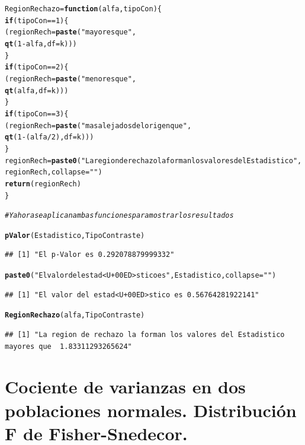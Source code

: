 \documentclass[10pt,a4paper]{article}\usepackage[]{graphicx}\usepackage[]{color}
\makeatletter
\newcommand{\hlnum}[1]{\textcolor[rgb]{0.686,0.059,0.569}{#1}}%
\newcommand{\hlstr}[1]{\textcolor[rgb]{0.192,0.494,0.8}{#1}}%
\newcommand{\hlcom}[1]{\textcolor[rgb]{0.678,0.584,0.686}{\textit{#1}}}%
\newcommand{\hlopt}[1]{\textcolor[rgb]{0,0,0}{#1}}%
\newcommand{\hlstd}[1]{\textcolor[rgb]{0.345,0.345,0.345}{#1}}%
\newcommand{\hlkwa}[1]{\textcolor[rgb]{0.161,0.373,0.58}{\textbf{#1}}}%
\newcommand{\hlkwb}[1]{\textcolor[rgb]{0.69,0.353,0.396}{#1}}%
\newcommand{\hlkwc}[1]{\textcolor[rgb]{0.333,0.667,0.333}{#1}}%
\newcommand{\hlkwd}[1]{\textcolor[rgb]{0.737,0.353,0.396}{\textbf{#1}}}%
\newenvironment{kframe}{%
 \def\at@end@of@kframe{}%
 \ifinner\ifhmode%
  \def\at@end@of@kframe{\end{minipage}}%
  \begin{minipage}{\columnwidth}%
 \fi\fi%
 \def\FrameCommand##1{\hskip\@totalleftmargin \hskip-\fboxsep
 \colorbox{shadecolor}{##1}\hskip-\fboxsep
     \hskip-\linewidth \hskip-\@totalleftmargin \hskip\columnwidth}%
 \MakeFramed {\advance\hsize-\width
   \@totalleftmargin\z@ \linewidth\hsize
   \@setminipage}}%
 {\par\unskip\endMakeFramed%
 \at@end@of@kframe}
\newenvironment{knitrout}{}{} %
\makeatother
\begin{document}
\begin{knitrout}
\begin{kframe}
\begin{alltt}
    \hlstd{RegionRechazo} \hlkwb{=} \hlkwa{function}\hlstd{(}\hlkwc{alfa}\hlstd{,} \hlkwc{tipoCon}\hlstd{)\{}
      \hlkwa{if}\hlstd{(tipoCon} \hlopt{==} \hlnum{1}\hlstd{)\{}
        \hlstd{(regionRech} \hlkwb{=} \hlkwd{paste}\hlstd{(}\hlstr{"mayores que "}\hlstd{,}
                            \hlkwd{qt}\hlstd{(}\hlnum{1} \hlopt{-} \hlstd{alfa,} \hlkwc{df}\hlstd{=k)))}
      \hlstd{\}}
      \hlkwa{if}\hlstd{(tipoCon} \hlopt{==} \hlnum{2}\hlstd{)\{}
        \hlstd{(regionRech} \hlkwb{=} \hlkwd{paste}\hlstd{(}\hlstr{"menores que "}\hlstd{,}
                            \hlkwd{qt}\hlstd{(alfa,} \hlkwc{df}\hlstd{=k)))}
      \hlstd{\}}
      \hlkwa{if}\hlstd{(tipoCon} \hlopt{==} \hlnum{3}\hlstd{)\{}
        \hlstd{(regionRech} \hlkwb{=} \hlkwd{paste}\hlstd{(}\hlstr{"mas alejados del origen que "}\hlstd{,}
                            \hlkwd{qt}\hlstd{(}\hlnum{1} \hlopt{-} \hlstd{(alfa}\hlopt{/}\hlnum{2}\hlstd{),} \hlkwc{df}\hlstd{=k)))}
      \hlstd{\}}
      \hlstd{regionRech} \hlkwb{=} \hlkwd{paste0}\hlstd{(}\hlstr{"La region de rechazo la forman los valores del Estadistico "}\hlstd{,}
                         \hlstd{regionRech,} \hlkwc{collapse}\hlstd{=}\hlstr{""}\hlstd{)}
      \hlkwd{return}\hlstd{(regionRech)}
    \hlstd{\}}

\hlcom{# Y ahora se aplican ambas funciones para mostrar los resultados}

\hlkwd{pValor}\hlstd{(Estadistico, TipoContraste)}
\end{alltt}
\begin{verbatim}
## [1] "El p-Valor es 0.292078879999332"
\end{verbatim}
\begin{alltt}
\hlkwd{paste0}\hlstd{(}\hlstr{"El valor del estad<U+00ED>stico es "}\hlstd{, Estadistico,} \hlkwc{collapse} \hlstd{=} \hlstr{""}\hlstd{)}
\end{alltt}
\begin{verbatim}
## [1] "El valor del estad<U+00ED>stico es 0.56764281922141"
\end{verbatim}
\begin{alltt}
\hlkwd{RegionRechazo}\hlstd{(alfa, TipoContraste)}
\end{alltt}
\begin{verbatim}
## [1] "La region de rechazo la forman los valores del Estadistico mayores que  1.83311293265624"
\end{verbatim}
\end{kframe}
\end{knitrout}


\section{Cociente de varianzas en dos poblaciones normales. Distribución F de Fisher-Snedecor.}
\end{document}
